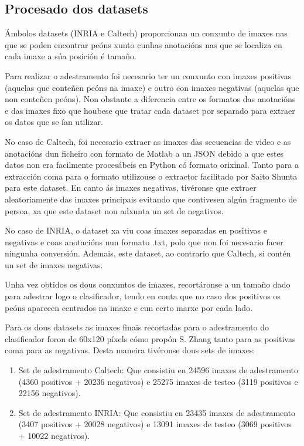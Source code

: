 \documentclass[galician]{./head/uvigo-tfg}
\begin{document}
        \subsection{Procesado dos datasets}\label{datasets} Ámbolos datasets (INRIA e Caltech) proporcionan un conxunto de imaxes nas que se poden encontrar peóns xunto cunhas anotacións nas que se localiza en cada imaxe a súa posición é tamaño.
        \par Para realizar o adestramento foi necesario ter un conxunto con imaxes positivas (aquelas que conteñen peóns na imaxe) e outro con imaxes negativas (aquelas que non conteñen peóns). Non obstante a diferencia entre os formatos das anotacións e das imaxes fixo que houbese que tratar cada dataset por separado para extraer os datos que se ían utilizar. 
        \par No caso de Caltech,  foi necesario extraer as imaxes das secuencias de video e as anotacións dun ficheiro con formato de Matlab a un JSON debido a que estes datos  non era facilmente procesábeis en Python có formato orixinal. Tanto para a extracción coma para o formato utilizouse o extractor facilitado por Saito Shunta para este dataset\cite{Saito}. En canto ás imaxes negativas, tivéronse que extraer aleatoriamente das imaxes principais evitando que contivesen algún fragmento de persoa, xa que este dataset non adxunta un set de negativos.
        \par  No caso de INRIA, o dataset xa viu coas imaxes separadas en positivas e negativas e coas anotacións nun formato .txt, polo que non foi necesario facer ningunha conversión. Ademais, este dataset, ao contrario que Caltech, si contén un set de imaxes negativas.
        \par Unha vez obtidos os dous conxuntos de imaxes, recortáronse a un tamaño dado para adestrar logo o clasificador, tendo en conta que no caso dos positivos os peóns aparecen centrados na imaxe e cun certo marxe por cada lado.
        \par Para os dous datasets as imaxes finais recortadas para o adestramento do clasificador foron de 60x120 píxels cómo propón S. Zhang\cite{zhang}\cite{alarcon} tanto para as positivas coma para as negativas. Desta maneira tivéronse dous sets de imaxes:
         \begin{enumerate}
            \item Set de adestramento Caltech: Que consistiu en 24596 imaxes de adestramento (4360 positivos + 20236 negativos) e 25275 imaxes de testeo (3119 positivos e 22156 negativos).
            
            \item Set de adestramento INRIA: Que consistiu en 23435 imaxes de adestramento (3407 positivos + 20028 negativos) e 13091 imaxes de testeo (3069 positivos + 10022 negativos).
        \end{enumerate}
  
\end{document}
